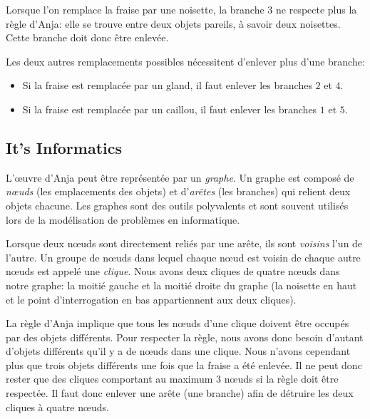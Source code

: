 \documentclass[a4paper,11pt]{report}
\newcommand{\taskGraphicsFolder}{..}
\begin{document}
Lorsque l’on remplace la fraise par une noisette, la branche $3$ ne respecte plus la règle d’Anja: elle se trouve entre deux objets pareils, à savoir deux noisettes. Cette branche doit donc être enlevée.

{\centering%
\par}

Les deux autres remplacements possibles nécessitent d’enlever plus d’une branche:

\begin{itemize}
  \item Si la fraise est remplacée par un gland, il faut enlever les branches $2$ et $4$.
  \item Si la fraise est remplacée par un caillou, il faut enlever les branches $1$ et $5$.
\end{itemize}

{\centering%
\par}


\subsection*{It’s Informatics}

L’œuvre d’Anja peut être représentée par un \emph{graphe}. Un graphe est composé de \emph{nœuds} (les emplacements des objets) et d’\emph{arêtes} (les branches) qui relient deux objets chacune. Les graphes sont des outils polyvalents et sont souvent utilisés lors de la modélisation de problèmes en informatique.

Lorsque deux nœuds sont directement reliés par une arête, ils sont \emph{voisins} l’un de l’autre. Un groupe de nœuds dans lequel chaque nœud est voisin de chaque autre nœuds est appelé une \emph{clique}. Nous avons deux cliques de quatre nœuds dans notre graphe: la moitié gauche et la moitié droite du graphe (la noisette en haut et le point d’interrogation en bas appartiennent aux deux cliques).

La règle d’Anja implique que tous les nœuds d’une clique doivent être occupés par des objets différents. Pour respecter la règle, nous avons donc besoin d’autant d’objets différents qu’il y a de nœuds dans une clique. Nous n’avons cependant plus que trois objets différents une fois que la fraise a été enlevée. Il ne peut donc rester que des cliques comportant au maximum $3$ nœuds si la règle doit être respectée. Il faut donc enlever une arête (une branche) afin de détruire les deux cliques à quatre nœuds.
\end{document}
